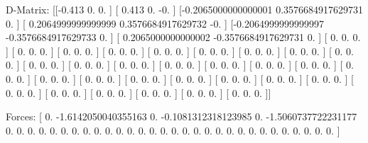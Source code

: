 D-Matrix:
[[-0.413               0.                  0.                ]
 [ 0.413               0.                 -0.                ]
 [-0.2065000000000001  0.3576684917629731  0.                ]
 [ 0.2064999999999999  0.3576684917629732 -0.                ]
 [-0.2064999999999997 -0.3576684917629733  0.                ]
 [ 0.2065000000000002 -0.3576684917629731  0.                ]
 [ 0.                  0.                  0.                ]
 [ 0.                  0.                  0.                ]
 [ 0.                  0.                  0.                ]
 [ 0.                  0.                  0.                ]
 [ 0.                  0.                  0.                ]
 [ 0.                  0.                  0.                ]
 [ 0.                  0.                  0.                ]
 [ 0.                  0.                  0.                ]
 [ 0.                  0.                  0.                ]
 [ 0.                  0.                  0.                ]
 [ 0.                  0.                  0.                ]
 [ 0.                  0.                  0.                ]
 [ 0.                  0.                  0.                ]
 [ 0.                  0.                  0.                ]
 [ 0.                  0.                  0.                ]
 [ 0.                  0.                  0.                ]
 [ 0.                  0.                  0.                ]
 [ 0.                  0.                  0.                ]
 [ 0.                  0.                  0.                ]
 [ 0.                  0.                  0.                ]
 [ 0.                  0.                  0.                ]
 [ 0.                  0.                  0.                ]
 [ 0.                  0.                  0.                ]
 [ 0.                  0.                  0.                ]
 [ 0.                  0.                  0.                ]
 [ 0.                  0.                  0.                ]
 [ 0.                  0.                  0.                ]
 [ 0.                  0.                  0.                ]
 [ 0.                  0.                  0.                ]
 [ 0.                  0.                  0.                ]]

Forces:
[ 0.                 -1.6142050040355163  0.
 -0.1081312318123985  0.                 -1.5060737722231177
  0.                  0.                  0.
  0.                  0.                  0.
  0.                  0.                  0.
  0.                  0.                  0.
  0.                  0.                  0.
  0.                  0.                  0.
  0.                  0.                  0.
  0.                  0.                  0.
  0.                  0.                  0.
  0.                  0.                  0.                ]

